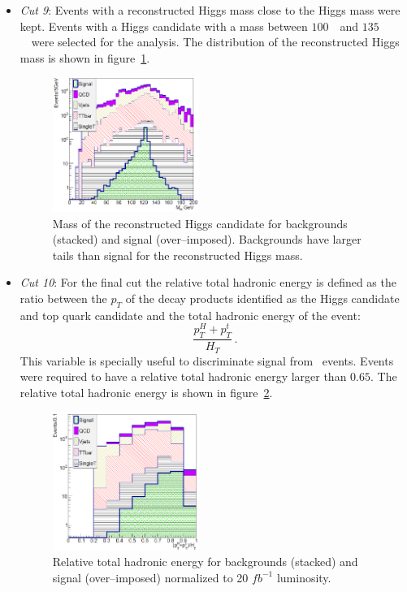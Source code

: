 \begin{itemize}
\item \textit{Cut 9}: Events with a reconstructed Higgs mass close to the Higgs mass were kept. Events with a Higgs candidate with a mass between $100$~\GeVcc~and $135$~\GeVcc~were selected for the analysis. The distribution of the reconstructed Higgs mass is shown in figure~\ref{fig:Var4}.

\begin{figure}[!Hhtbp]
  \begin{center}
    \includegraphics[width=0.45\textwidth]{figs/Pheno/MH.png}
    \caption{Mass of the reconstructed Higgs candidate for backgrounds (stacked) and signal (over--imposed). Backgrounds have larger tails than signal for the reconstructed Higgs mass.}
    \label{fig:Var4}
  \end{center}
\end{figure}

\item \textit{Cut 10}: For the final cut the relative total hadronic energy is defined as the ratio between the $p_{T}$ of the decay products identified as the Higgs candidate and top quark candidate and the total hadronic energy of the event: $$\frac{p_{T}^{H}+p_{T}^{t}}{H_{T}}\,.$$ This variable is specially useful to discriminate signal from \ttbar~events. Events were required to have a relative total hadronic energy larger than $0.65$. The relative total hadronic energy is shown in figure~\ref{fig:Var5}.

\begin{figure}[!Hhtbp]
  \begin{center}
    \includegraphics[width=0.45\textwidth]{figs/Pheno/RelHT.png}
    \caption{Relative total hadronic energy for backgrounds (stacked) and signal (over--imposed) normalized to 20 $fb^{-1}$ luminosity.}
    \label{fig:Var5}
  \end{center}
\end{figure}

\end{itemize}

